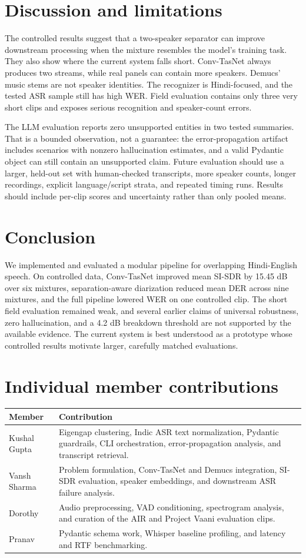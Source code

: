 \documentclass[11pt,a4paper,twocolumn]{article}
\begin{document}
\section{Discussion and limitations}
The controlled results suggest that a two-speaker separator can improve downstream processing when the mixture resembles the model's training task. They also show where the current system falls short. Conv-TasNet always produces two streams, while real panels can contain more speakers. Demucs' music stems are not speaker identities. The recognizer is Hindi-focused, and the tested ASR sample still has high WER. Field evaluation contains only three very short clips and exposes serious recognition and speaker-count errors.

The LLM evaluation reports zero unsupported entities in two tested summaries. That is a bounded observation, not a guarantee: the error-propagation artifact includes scenarios with nonzero hallucination estimates, and a valid Pydantic object can still contain an unsupported claim. Future evaluation should use a larger, held-out set with human-checked transcripts, more speaker counts, longer recordings, explicit language/script strata, and repeated timing runs. Results should include per-clip scores and uncertainty rather than only pooled means.

\section{Conclusion}
We implemented and evaluated a modular pipeline for overlapping Hindi-English speech. On controlled data, Conv-TasNet improved mean SI-SDR by 15.45 dB over six mixtures, separation-aware diarization reduced mean DER across nine mixtures, and the full pipeline lowered WER on one controlled clip. The short field evaluation remained weak, and several earlier claims of universal robustness, zero hallucination, and a 4.2 dB breakdown threshold are not supported by the available evidence. The current system is best understood as a prototype whose controlled results motivate larger, carefully matched evaluations.

\section*{Individual member contributions}
\begin{tabularx}{\linewidth}{@{}l X@{}}
\toprule
Member & Contribution \\
\midrule
Kushal Gupta & Eigengap clustering, Indic ASR text normalization, Pydantic guardrails, CLI orchestration, error-propagation analysis, and transcript retrieval. \\
Vansh Sharma & Problem formulation, Conv-TasNet and Demucs integration, SI-SDR evaluation, speaker embeddings, and downstream ASR failure analysis. \\
Dorothy & Audio preprocessing, VAD conditioning, spectrogram analysis, and curation of the AIR and Project Vaani evaluation clips. \\
Pranav & Pydantic schema work, Whisper baseline profiling, and latency and RTF benchmarking. \\
\bottomrule
\end{tabularx}
\end{document}
